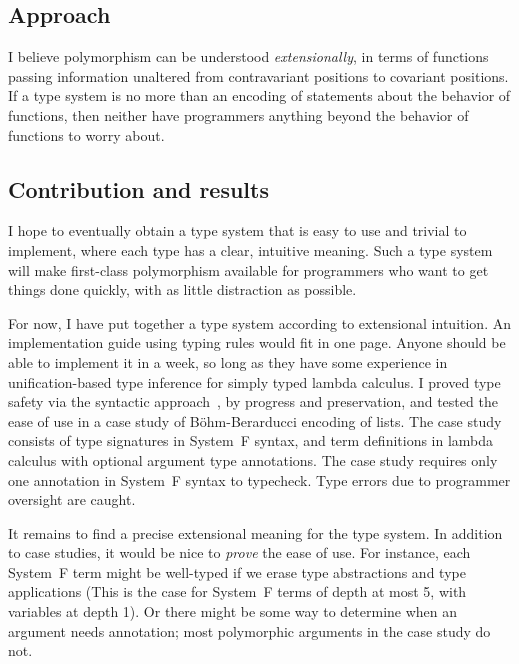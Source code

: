 \documentclass{amsart}
\begin{document}
\subsection{Approach} I believe polymorphism can be understood
\emph{extensionally}, in terms of functions passing information
unaltered from contravariant positions to covariant positions. If
a type system is no more than an encoding of statements about the
behavior of functions, then neither have programmers anything
beyond the behavior of functions to worry about.

\subsection{Contribution and results}

I hope to eventually obtain a type system that is easy to use and
trivial to implement, where each type has a clear, intuitive
meaning. Such a type system will make first-class polymorphism
available for programmers who want to get things done quickly,
with as little distraction as possible.

For now, I have put together a type system according to
extensional intuition. An implementation guide using typing rules
would fit in one page. Anyone should be able to implement it in a
week, so long as they have some experience in unification-based
type inference for simply typed lambda calculus. I proved type
safety via the syntactic approach~\cite{Wright94}, by progress
and preservation, and tested the ease of use in a case study of
B\"ohm-Berarducci encoding of lists. The case study consists of
type signatures in System~F syntax, and term definitions in
lambda calculus with optional argument type annotations. The case
study requires only one annotation in System~F syntax to
typecheck. Type errors due to programmer oversight are caught.

It remains to find a precise extensional meaning for the type
system. In addition to case studies, it would be nice to
\emph{prove} the ease of use. For instance, each System~F term
might be well-typed if we erase type abstractions and type
applications (This is the case for System~F terms of depth at
most 5, with variables at depth 1). Or there might be some way to
determine when an argument needs annotation; most polymorphic
arguments in the case study do not.


\end{document}
